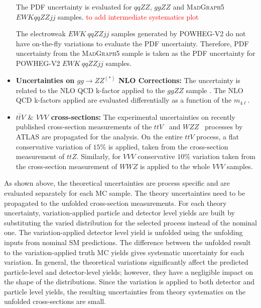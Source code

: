 \begin{itemize}
{The PDF uncertainty is evaluated for $qqZZ$, $ggZZ$ and \textsc{MadGraph5} $EWK qqZZjj$ samples. \textcolor{red}{to add intermediate systematics plot}  %


The electroweak $EWK~qqZZjj$ samples generated by \textsc{POWHEG-V2} do not have on-the-fly variations to evaluate the PDF uncertainty. Therefore, PDF uncertainty from the \textsc{MadGraph5} sample is taken as the PDF uncertainty for \textsc{POWHEG-V2} $EWK~qqZZjj$ samples.
}

\item{\textbf{Uncertainties on $gg\rightarrow ZZ^{(\ast)}$ NLO Corrections:}
The uncertainty is related to the NLO QCD k-factor applied to the $ggZZ$ sample \cite{ggZZNLOUnc}. The NLO QCD k-factors applied are evaluated differentially as a function of the $m_{4\ell}$. 
}

\item{\textbf{$t\bar{t}V$ $\&$ $VVV$ cross-sections:}
The experimental uncertainties on recently published cross-section measurements of the $ttV$~\cite{ATLAS_ttV} and $WZZ$~\cite{ATLAS_VVV} processes by ATLAS are propagated for the analysis. On the entire $ttV$ process, a flat conservative variation of $15\%$ is applied, taken from the cross-section measurement of $ttZ$. Similarly, for $VVV$ conservative $10\%$ variation taken from the cross-section measurement of $WWZ$ is applied to the whole $VVV$ samples.
}

\end{itemize}

As shown above, the theoretical uncertainties are process specific and are evaluated separately for each MC sample. The theory uncertainties need to be propagated to the unfolded cross-section measurements. For each theory uncertainty, variation-applied particle and detector level yields are built by substituting the varied distribution for the selected process instead of the nominal one. The variation-applied detector level yield is unfolded using the unfolding inputs from nominal SM predictions. The difference between the unfolded result to the variation-applied truth MC yields gives systematic uncertainty for each variation. In general, the theoretical variations significantly affect the predicted particle-level and detector-level yields; however, they have a negligible impact on the shape of the distributions. Since the variation is applied to both detector and particle level yields, the resulting uncertainties from theory systematics on the unfolded cross-sections are small.

